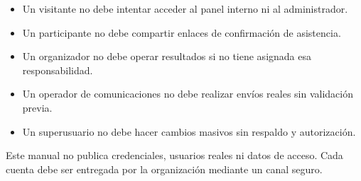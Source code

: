 \begin{itemize}
    \item Un visitante no debe intentar acceder al panel interno ni al administrador.
    \item Un participante no debe compartir enlaces de confirmación de asistencia.
    \item Un organizador no debe operar resultados si no tiene asignada esa responsabilidad.
    \item Un operador de comunicaciones no debe realizar envíos reales sin validación previa.
    \item Un superusuario no debe hacer cambios masivos sin respaldo y autorización.
\end{itemize}

\begin{advertencia}
Este manual no publica credenciales, usuarios reales ni datos de acceso. Cada cuenta debe ser entregada por la organización mediante un canal seguro.
\end{advertencia}
